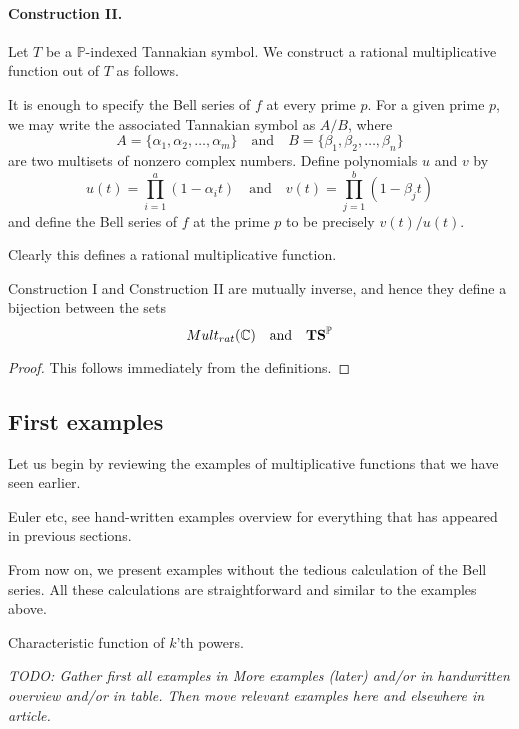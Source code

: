 \paragraph{Construction II.} Let $T$ be a $\mathbb{P}$-indexed Tannakian symbol. We construct a rational multiplicative function out of $T$ as follows.

It is enough to specify the Bell series of $f$ at every prime $p$. For a given prime $p$, we may write the associated Tannakian symbol as $A/B$, where 
$$ A = \{ \alpha_1, \alpha_2, \ldots, \alpha_m \} \quad \mathrm{and} \quad B =  \{ \beta_1, \beta_2, \ldots, \beta_n \}$$
are two multisets of nonzero complex numbers. Define polynomials $u$ and $v$ by 
$$ u(t) = \prod_{i=1}^a (1-{\alpha_i}t) \quad \mathrm{and} \quad v(t) = \prod_{j=1}^b (1-{\beta_j}t)$$
and define the Bell series of $f$ at the prime $p$ to be precisely $v(t) / u(t)$. 

Clearly this defines a rational multiplicative function.


\begin{theorem}
Construction I and Construction II are mutually inverse, and hence they define a bijection between the sets
$$   Mult_{rat}(\mathbb{C}) \quad \textrm{and}  \quad  \mathbf{TS}^{\mathbb{P}} $$
\end{theorem}
\begin{proof}
This follows immediately from the definitions.
\end{proof}

\subsection{First examples}

Let us begin by reviewing the examples of multiplicative functions that we have seen earlier.

\begin{example}
Euler etc, see hand-written examples overview for everything that has appeared in previous sections.
\end{example}

From now on, we present examples without the tedious calculation of the Bell series. All these calculations are straightforward and similar to the examples above.

\begin{example}
Characteristic function of $k$'th powers.
\end{example}


\emph{TODO: Gather first all examples in More examples (later) and/or in handwritten overview and/or in table. Then move relevant examples here and elsewhere in article.}

